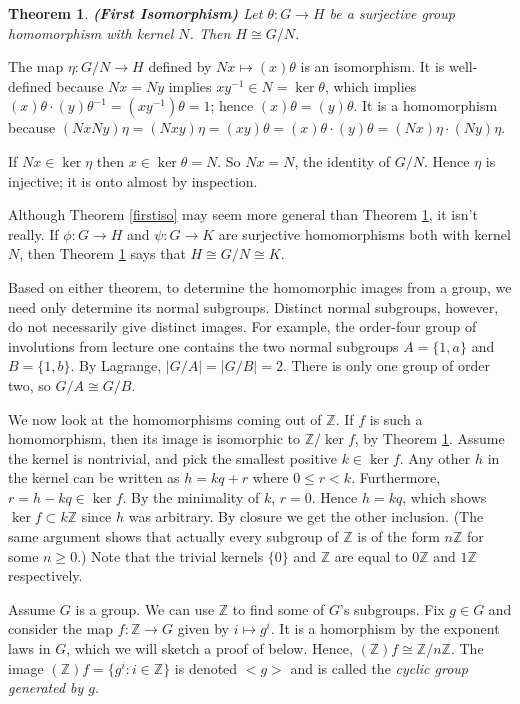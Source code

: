 \documentclass[letterpaper]{article}
\newtheorem{theorem}{Theorem}[section]
\newcommand{\mdot}{{\cdot}}
\newenvironment{proof}[1][Proof]{\begin{trivlist}
\item[\hskip \labelsep {\bfseries #1}]}{\end{trivlist}}
\begin{document}
\begin{theorem}
\label{iso1}
\emph{\textbf{(First Isomorphism)}}
Let $\theta \colon G \rightarrow H$ be a surjective group homomorphism
with kernel $N$.  Then $H \cong G/N$.
\end{theorem}
\begin{proof}
The map $\eta \colon G/N \rightarrow H$ defined by $Nx \mapsto
(x)\theta$ is an isomorphism. It is well-defined because $Nx = Ny$
implies $xy^{-1} \in N = \ker{\theta}$, which implies
$(x)\theta\mdot(y)\theta^{-1} = (xy^{-1})\theta = 1$; hence $(x)\theta
= (y)\theta$. It is a homomorphism because $(NxNy)\eta = (Nxy)\eta
= (xy)\theta = (x)\theta\mdot(y)\theta = (Nx)\eta\mdot(Ny)\eta$.

If $Nx \in \ker{\eta}$ then $x \in \ker{\theta} = N$. So $Nx = N$,
the identity of $G/N$. Hence $\eta$ is injective; it is onto almost
by inspection.
\end{proof}

Although Theorem \ref{firstiso} may seem more general than Theorem
\ref{iso1}, it isn't really. If $\phi \colon G \rightarrow H$ and
$\psi \colon G \rightarrow K$ are surjective homomorphisms both
with kernel $N$, then Theorem \ref{iso1} says that $H \cong G/N
\cong K$.

Based on either theorem, to determine the homomorphic images from
a group, we need only determine its normal subgroups. Distinct
normal subgroups, however, do not necessarily give distinct images.
For example, the order-four group of involutions from lecture one
contains the two normal subgroups $A = \{1, a\}$ and $B = \{1, b\}$.
By Lagrange, $|G/A| = |G/B| = 2$. There is only one group of order
two, so $G/A \cong G/B$.

We now look at the homomorphisms coming out of $\mathbb{Z}$. If $f$
is such a homomorphism, then its image is isomorphic to
$\mathbb{Z}/\ker{f}$, by Theorem \ref{iso1}. Assume the kernel is
nontrivial, and pick the smallest positive $k \in \ker{f}$. Any
other $h$ in the kernel can be written as $h = kq + r$ where $0 \le
r < k$. Furthermore, $r = h - kq \in \ker{f}$. By the minimality
of $k$, $r = 0$. Hence $h = kq$, which shows $\ker{f} \subset
k\mathbb{Z}$ since $h$ was arbitrary. By closure we get the other
inclusion. (The same argument shows that actually every subgroup
of $\mathbb{Z}$ is of the form $n\mathbb{Z}$ for some $n \ge 0$.)
Note that the trivial kernels $\{0\}$ and $\mathbb{Z}$ are equal
to $0\mathbb{Z}$ and $1\mathbb{Z}$ respectively.

Assume $G$ is a group. We can use $\mathbb{Z}$ to find some of $G$'s
subgroups. Fix $g \in G$ and consider the map $f \colon \mathbb{Z}
\rightarrow G$ given by $i \mapsto g^{i}$. It is a homorphism by
the exponent laws in $G$, which we will sketch a proof of below.
Hence, $(\mathbb{Z})f \cong \mathbb{Z}/n\mathbb{Z}$. The image
$(\mathbb{Z})f = \{g^i \colon i \in \mathbb{Z}\}$ is denoted ${<}g{>}$
and is called the \emph{cyclic group generated by $g$}.
\end{document}
